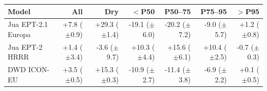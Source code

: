 \begin{tabular}{lrrrrrr}
\toprule
Model & All & Dry & $<$P50 & P50--75 & P75--95 & $>$P95 \\
\midrule
Jua EPT-2.1 Europa & +7.8 ($\pm$0.9) & +29.3 ($\pm$1.4) & -19.1 ($\pm$6.0) & -20.2 ($\pm$7.2) & -9.0 ($\pm$5.7) & +1.2 ($\pm$0.8) \\
Jua EPT-2 HRRR & +1.4 ($\pm$3.4) & -3.6 ($\pm$9.7) & +10.3 ($\pm$4.4) & +15.6 ($\pm$6.1) & +10.4 ($\pm$2.5) & -0.7 ($\pm$0.3) \\
DWD ICON-EU & +3.5 ($\pm$0.5) & +15.3 ($\pm$0.3) & -10.9 ($\pm$2.7) & -11.4 ($\pm$3.8) & -6.9 ($\pm$2.2) & +0.1 ($\pm$0.5) \\
\bottomrule
\end{tabular}
